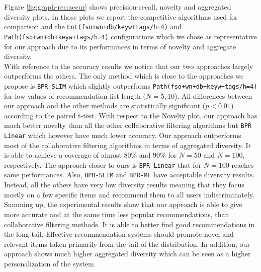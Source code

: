 Figure \ref{fig:graph-rec:accur} shows precision-recall, novelty and aggregated diversity plots. In those plots we report the competitive algorithms used for comparison and the \texttt{Ent(fso+wn+db/keyw+tags/h=4)} and \texttt{Path(fso+wn+db+keyw+tags/h=4)} configurations which we chose as representative for our approach due to its performances in terms of novelty and aggregate diversity. 
\\With reference to the accuracy results we notice that our two approaches largely outperforms the others. The only method which is close to the approaches we propose is \texttt{BPR-SLIM} which slightly outperforms \texttt{Path(fso+wn+db+keyw+tags/h=4)} for low values of recommendation list length ($N=5,10$). All differences between our approach and the other methods are statistically significant ($p<0.01$) according to the paired t-test.
With respect to the Novelty plot, our approach has much better novelty than all the other collaborative filtering algorithms but \texttt{BPR Linear} which however have much lower accuracy. 
Our approach outperforms most of the collaborative filtering algorithms in terms of aggregated diversity. It is able to achieve a coverage of almost 80\% and 90\% for $N=50$ and $N=100$, respectively. The approach closer to ours is \texttt{BPR Linear} that for $N=100 $ reaches same performances. Also, \texttt{BPR-SLIM} and \texttt{BPR-MF} have acceptable diversity results. Instead, all the others have very low diversity results meaning that they focus mostly on a few specific items and recommend them to all users indiscriminately. 
\\Summing up, the experimental results show that our approach is able to give more accurate and at the same time less popular recommendations, than collaborative filtering methods. It is able to better find good recommendations in the long tail. 
Effective recommendation systems should promote novel and relevant items taken primarily from the tail of the distribution. 
In addition, our approach shows much higher aggregated diversity which can be seen as a higher personalization of the system. 

